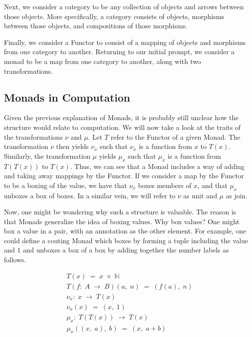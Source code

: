 Next, we consider a category to be any collection of objects and arrows between
those objects. More specifically, a category consists of objects, morphisms between
those objects, and compositions of those morphisms.

Finally, we consider a Functor to consist of a mapping of objects and morphisms
from one category to another. Returning to our initial prompt, we consider a monad
to be a map from one category to another, along with two transformations.

\subsection{Monads in Computation}
Given the previous explanation of Monads, it is probably still unclear how the
structure would relate to computation. We will now take a look at the traits of
the transformations $\nu$ and $\mu$. Let $T$ refer to the Functor of a given Monad.
The transformation $\nu$ then yields $\nu_{x}$ such that $\nu_{x}$ is a function from
$x$ to $T(x)$. Similarly, the transformation $\mu$ yields $\mu_{x}$ such that
$\mu_{x}$ is a function from $T(T(x))$ to $T(x)$. Thus, we can see that a Monad
includes a way of adding and taking away mappings by the Functor. If we consider
a map by the Functor to be a boxing of the value, we have that $\nu_{x}$ boxes
members of $x$, and that $\mu_{x}$ unboxes a box of boxes. In a similar vein, we will
refer to $\nu$ as unit and $\mu$ as join.

Now, one might be wondering why such a structure is valuable. The reason is that
Monads generalize the idea of boxing values. Why box values? One might box a value
in a pair, with an annotation as the other element. For example, one could define
a couting Monad which boxes by forming a tuple including the value and $1$ and unboxes
a box of a box by adding together the number labels as follows.

\begin{figure}[htp]
\footnotesize
\caption{}\label{}
\begin{align*}
& T(x) \; = \; x \; \times \; \mathbb{N}
\\& T(f: \; A \; \to \; B)(a, \; n) \; = \; (f(a), \; n)
\\& \nu_{x}: \; x \; \to \; T(x)
\\& \nu_{x}(x) \; = \; (x, \; 1)
\\& \mu_{x}: \; T(T(x)) \; \to \; T(x)
\\& \mu_{x}((x, \; a), \; b) \; = \; (x, \; a+b)
\end{align*}
\end{figure}

